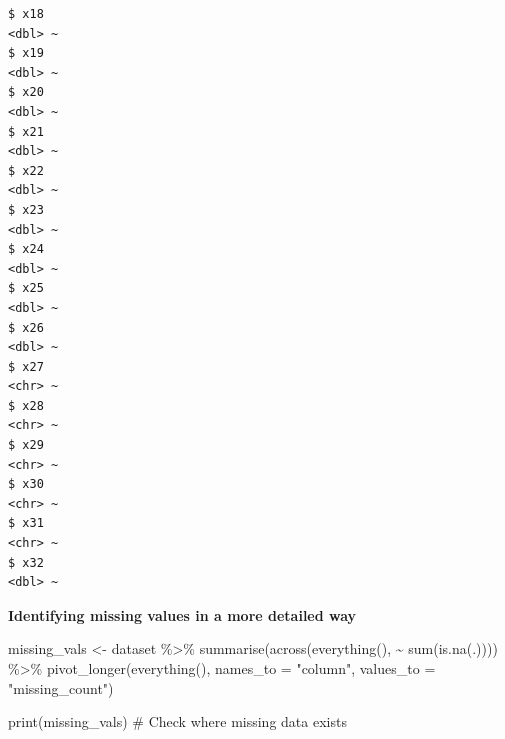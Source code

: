 \documentclass[
  letterpaper,
  DIV=11,
  numbers=noendperiod]{scrreprt}
\newenvironment{Shaded}{\begin{snugshade}}{\end{snugshade}}
\newcommand{\AttributeTok}[1]{\textcolor[rgb]{0.40,0.45,0.13}{#1}}
\newcommand{\CommentTok}[1]{\textcolor[rgb]{0.37,0.37,0.37}{#1}}
\newcommand{\FunctionTok}[1]{\textcolor[rgb]{0.28,0.35,0.67}{#1}}
\newcommand{\NormalTok}[1]{\textcolor[rgb]{0.00,0.23,0.31}{#1}}
\newcommand{\OtherTok}[1]{\textcolor[rgb]{0.00,0.23,0.31}{#1}}
\newcommand{\SpecialCharTok}[1]{\textcolor[rgb]{0.37,0.37,0.37}{#1}}
\newcommand{\StringTok}[1]{\textcolor[rgb]{0.13,0.47,0.30}{#1}}
\begin{document}
\begin{verbatim}
$ x18                                                                                                                 <dbl> ~
$ x19                                                                                                                 <dbl> ~
$ x20                                                                                                                 <dbl> ~
$ x21                                                                                                                 <dbl> ~
$ x22                                                                                                                 <dbl> ~
$ x23                                                                                                                 <dbl> ~
$ x24                                                                                                                 <dbl> ~
$ x25                                                                                                                 <dbl> ~
$ x26                                                                                                                 <dbl> ~
$ x27                                                                                                                 <chr> ~
$ x28                                                                                                                 <chr> ~
$ x29                                                                                                                 <chr> ~
$ x30                                                                                                                 <chr> ~
$ x31                                                                                                                 <chr> ~
$ x32                                                                                                                 <dbl> ~
\end{verbatim}

\textbf{Identifying missing values in a more detailed way}

\begin{Shaded}
\begin{Highlighting}[]
\NormalTok{missing\_vals }\OtherTok{\textless{}{-}}\NormalTok{ dataset }\SpecialCharTok{\%\textgreater{}\%}
  \FunctionTok{summarise}\NormalTok{(}\FunctionTok{across}\NormalTok{(}\FunctionTok{everything}\NormalTok{(), }\SpecialCharTok{\textasciitilde{}} \FunctionTok{sum}\NormalTok{(}\FunctionTok{is.na}\NormalTok{(.)))) }\SpecialCharTok{\%\textgreater{}\%}
  \FunctionTok{pivot\_longer}\NormalTok{(}\FunctionTok{everything}\NormalTok{(), }\AttributeTok{names\_to =} \StringTok{"column"}\NormalTok{, }\AttributeTok{values\_to =} \StringTok{"missing\_count"}\NormalTok{)}

\FunctionTok{print}\NormalTok{(missing\_vals)  }\CommentTok{\# Check where missing data exists}
\end{Highlighting}
\end{Shaded}
\end{document}
